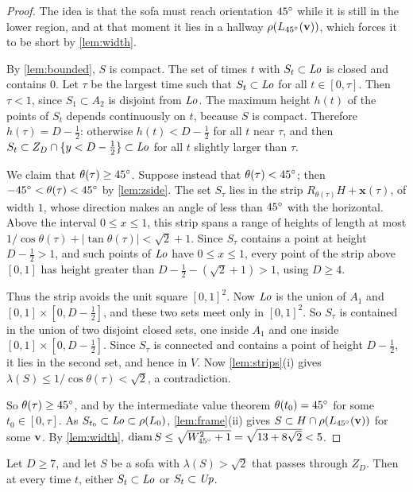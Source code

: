\begin{proof}
The idea is that the sofa must reach orientation $45^{\circ}$ while it is still in the lower region, and at that moment it lies in a hallway $\rho(L_{45^{\circ}}(\mathbf{v}))$, which forces it to be short by \cref{lem:width}.

By \cref{lem:bounded}, $S$ is compact. The set of times $t$ with $S_t\subset\mathit{Lo}$ is closed and contains $0$. Let $\tau$ be the largest time such that $S_t\subset\mathit{Lo}$ for all $t\in[0,\tau]$. Then $\tau<1$, since $S_1\subset A_2$ is disjoint from $\mathit{Lo}$. The maximum height $h(t)$ of the points of $S_t$ depends continuously on $t$, because $S$ is compact. Therefore $h(\tau)=D-\frac12$: otherwise $h(t)<D-\frac12$ for all $t$ near $\tau$, and then $S_t\subset Z_D\cap\{y<D-\frac12\}\subset\mathit{Lo}$ for all $t$ slightly larger than $\tau$.

We claim that $\theta(\tau)\ge45^{\circ}$. Suppose instead that $\theta(\tau)<45^{\circ}$; then $-45^{\circ}<\theta(\tau)<45^{\circ}$ by \cref{lem:zside}. The set $S_\tau$ lies in the strip $R_{\theta(\tau)}H+\mathbf{x}(\tau)$, of width $1$, whose direction makes an angle of less than $45^{\circ}$ with the horizontal. Above the interval $0\le x\le1$, this strip spans a range of heights of length at most $1/\cos\theta(\tau)+|\tan\theta(\tau)|<\sqrt2+1$. Since $S_\tau$ contains a point at height $D-\frac12>1$, and such points of $\mathit{Lo}$ have $0\le x\le 1$, every point of the strip above $[0,1]$ has height greater than $D-\frac12-(\sqrt2+1)>1$, using $D\ge4$.

Thus the strip avoids the unit square $[0,1]^2$. Now $\mathit{Lo}$ is the union of $A_1$ and $[0,1]\times[0,D-\frac12]$, and these two sets meet only in $[0,1]^2$. So $S_\tau$ is contained in the union of two disjoint closed sets, one inside $A_1$ and one inside $[0,1]\times[0,D-\frac12]$. Since $S_\tau$ is connected and contains a point of height $D-\frac12$, it lies in the second set, and hence in $V$. Now \cref{lem:strips}(i) gives $\lambda(S)\le1/\cos\theta(\tau)<\sqrt2$, a contradiction.

So $\theta(\tau)\ge45^{\circ}$, and by the intermediate value theorem $\theta(t_0)=45^{\circ}$ for some $t_0\in[0,\tau]$. As $S_{t_0}\subset\mathit{Lo}\subset\rho(L_0)$, \cref{lem:frame}(ii) gives $S\subset H\cap\rho(L_{45^{\circ}}(\mathbf{v}))$ for some $\mathbf{v}$. By \cref{lem:width}, $\operatorname{diam} S\le\sqrt{W_{45^{\circ}}^2+1}=\sqrt{13+8\sqrt2}<5$.
\end{proof}

\begin{lem}\label{lem:onecorner}
Let $D\ge7$, and let $S$ be a sofa with $\lambda(S)>\sqrt2$ that passes through $Z_D$. Then at every time $t$, either $S_t\subset\mathit{Lo}$ or $S_t\subset\mathit{Up}$.
\end{lem}

